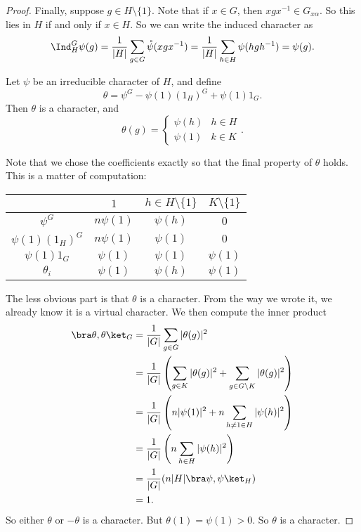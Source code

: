 \documentclass[a4paper]{article}
\begin{document}
\begin{proof}
  Finally, suppose $g \in H \setminus \{1\}$. Note that if $x \in G$, then $xgx^{-1} \in G_{x\alpha}$. So this lies in $H$ if and only if $x \in H$. So we can write the induced character as
  \[
    \Ind_H^G \psi(g) = \frac{1}{|H|} \sum_{g \in G} \mathring{\psi}(xgx^{-1}) = \frac{1}{|H|} \sum_{h \in H} \psi(hgh^{-1}) = \psi(g).
  \]
  \begin{claim}
    Let $\psi$ be an irreducible character of $H$, and define
    \[
      \theta = \psi^G - \psi(1) (1_H)^G + \psi(1) 1_G.
    \]
    Then $\theta$ is a character, and
    \[
      \theta(g) =
      \begin{cases}
        \psi(h) & h \in H\\
        \psi(1) & k \in K
      \end{cases}.
    \]
  \end{claim}
  Note that we chose the coefficients exactly so that the final property of $\theta$ holds. This is a matter of computation:
  \begin{center}
    \begin{tabular}{cccc}
      \toprule
      & $1$ & $h \in H \setminus \{1\}$ & $K \setminus \{1\}$\\
      \midrule
      $\psi^G$ & $n \psi(1)$ & $\psi(h)$ & $0$\\
      $\psi(1) (1_H)^G$ & $n \psi(1)$ & $\psi(1)$ & $0$\\
      $\psi(1) 1_G$ & $\psi(1)$ & $\psi(1)$ & $\psi(1)$\\
      $\theta_i$ & $\psi(1)$ & $\psi(h)$ & $\psi(1)$\\
      \bottomrule
    \end{tabular}
  \end{center}
  The less obvious part is that $\theta$ is a character. From the way we wrote it, we already know it is a virtual character. We then compute the inner product
  \begin{align*}
    \bra \theta, \theta\ket_G &= \frac{1}{|G|} \sum_{g \in G} |\theta(g)|^2\\
    &= \frac{1}{|G|} \left(\sum_{g \in K} |\theta(g)|^2 + \sum_{g \in G \setminus K} |\theta(g)|^2\right)\\
    &= \frac{1}{|G|} \left(n |\psi(1)|^2 + n\sum_{h \not= 1 \in H} |\psi(h)|^2\right)\\
    &= \frac{1}{|G|} \left(n \sum_{h \in H} |\psi(h)|^2 \right)\\
    &= \frac{1}{|G|} (n |H| \bra \psi, \psi\ket_H)\\
    &= 1.
  \end{align*}
  So either $\theta$ or $-\theta$ is a character. But $\theta(1) = \psi(1) > 0$. So $\theta$ is a character.


\end{proof}
\end{document}
